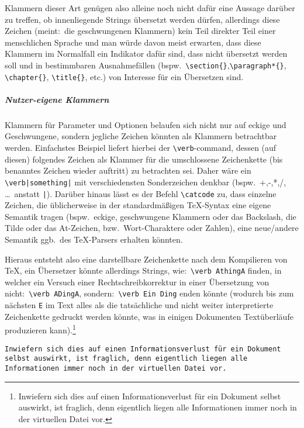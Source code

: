 Klammern dieser Art genügen also alleine noch nicht dafür eine Aussage darüber zu treffen, ob innenliegende Strings übersetzt werden dürfen, allerdings diese Zeichen (meint:\ die geschwungenen Klammern) kein Teil direkter Teil einer menschlichen Sprache und man würde davon meist erwarten, dass diese Klammern im Normalfall ein Indikator dafür sind, dass nicht übersetzt werden soll und in bestimmbaren Ausnahmefällen (bspw.\ \verb|\section{}|,\verb|\paragraph*{}|, \verb|\chapter{}|, \verb|\title{}|, etc.) von Interesse für ein Übersetzen sind. 

\subparagraph*{Nutzer-eigene Klammern}
Klammern für Parameter und Optionen belaufen sich nicht nur auf eckige und Geschwungene, sondern jegliche Zeichen könnten als Klammern betrachtbar werden. Einfachstes Beispiel liefert hierbei der \verb|\verb|-command, dessen (auf diesen) folgendes Zeichen als Klammer für die umschlossene Zeichenkette (bis benanntes Zeichen wieder auftritt) zu betrachten sei. Daher wäre ein \verb+\verb|something|+ mit verschiedensten Sonderzeichen denkbar (bspw.\ +,-,*,/, \ldots\ anstatt \verb/|/).
Darüber hinaus lässt es der Befehl \verb|\catcode| zu, dass einzelne Zeichen, die üblicherweise in der standardmäßigen \TeX{}-Syntax eine eigene Semantik tragen (bspw.\ eckige, geschwungene Klammern oder das Backslash, die Tilde oder das At-Zeichen, bzw.\ Wort-Charaktere oder Zahlen), eine neue/andere Semantik ggb.\ des \TeX{}-Parsers erhalten könnten.

Hieraus entsteht also eine darstellbare Zeichenkette nach dem Kompilieren von \TeX{}, ein Übersetzer könnte allerdings Strings, wie:\ \verb|\verb AthingA| finden, in welcher ein Versuch einer Rechtschreibkorrektur in einer Übersetzung von nicht:\ \verb|\verb ADingA|, sondern:\ \verb|\verb Ein Ding| enden könnte (wodurch bis zum nächsten \texttt{E} im Text alles als die tatsächliche und nicht weiter interpretierte Zeichenkette gedruckt werden könnte, was in einigen Dokumenten Textüberläufe produzieren kann).\footnote{Inwiefern sich dies auf einen Informationsverlust für ein Dokument selbst auswirkt, ist fraglich, denn eigentlich liegen alle Informationen immer noch in der virtuellen Datei vor.}\par
\verb|Inwiefern sich dies auf einen Informationsverlust für ein Dokument selbst auswirkt, ist fraglich, denn eigentlich liegen alle Informationen immer noch in der virtuellen Datei vor.|




